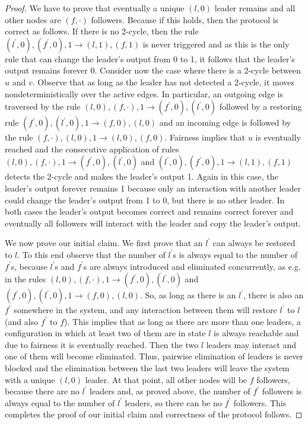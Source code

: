 \documentclass[preprint]{elsarticle}
\newcommand{\ra}{\rightarrow}
\begin{document}
\begin{proof}
We have to prove that eventually a unique $(l,0)$ leader remains and all other nodes are $(f,\cdot)$ followers. Because if this holds, then the protocol is correct as follows. If there is no 2-cycle, then the rule $(l^\prime,0), (f^\prime,0), 1 \ra (l,1), (f,1)$ is never triggered and as this is the only rule that can change the leader's output from 0 to 1, it follows that the leader's output remains forever 0.  Consider now the case where there is a 2-cycle between $u$ and $v$. Observe that as long as the leader has not detected a 2-cycle, it moves nondeterministically over the active edges. In particular, an outgoing edge is traversed by the rule $(l,0), (f,\cdot), 1 \ra (f^\prime,0), (l^\prime,0)$ followed by a restoring rule $(f^\prime,0), (l^\prime,0), 1 \ra (f,0), (l,0)$ and an incoming edge is followed by the rule $(f,\cdot), (l,0), 1 \ra (l,0), (f,0)$. Fairness implies that $u$ is eventually reached and the consecutive application of rules $(l,0), (f,\cdot), 1 \ra (f^\prime,0), (l^\prime,0)$ and $(l^\prime,0), (f^\prime,0), 1 \ra (l,1), (f,1)$ detects the 2-cycle and makes the leader's output 1. Again in this case, the leader's output forever remains 1 because only an interaction with another leader could change the leader's output from 1 to 0, but there is no other leader. In both cases the leader's output becomes correct and remains correct forever and eventually all followers will interact with the leader and copy the leader's output.

We now prove our initial claim. We first prove that an $l^\prime$ can always be restored to $l$. To this end observe that the number of $l^\prime$s is always equal to the number of $f^\prime$s, because $l^\prime$s and $f^\prime$s are always introduced and eliminated concurrently, as e.g. in the rules $(l,0), (f,\cdot), 1 \ra (f^\prime,0), (l^\prime,0)$ and $(f^\prime,0), (l^\prime,0), 1 \ra (f,0), (l,0)$. So, as long as there is an $l^\prime$, there is also an $f^\prime$ somewhere in the system, and any interaction between them will restore $l^\prime$ to $l$ (and also $f^\prime$ to $f$). This implies that as long as there are more than one leaders, a configuration in which at least two of them are in state $l$ is always reachable and due to fairness it is eventually reached. Then the two $l$ leaders may interact and one of them will become eliminated. Thus, pairwise elimination of leaders is never blocked and the elimination between the last two leaders will leave the system with a unique $(l,0)$ leader. At that point, all other nodes will be $f$ followers, because there are no $l^\prime$ leaders and, as proved above, the number of $f^\prime$ followers is always equal to the number of $l^\prime$ leaders, so there can be no $f^\prime$ followers. This completes the proof of our initial claim and correctness of the protocol follows.
\end{proof}
\end{document}
